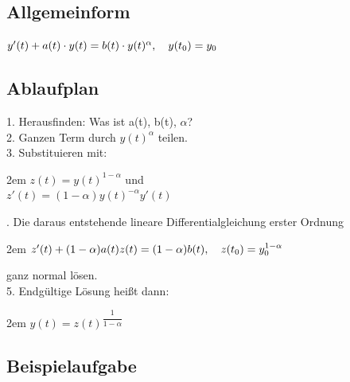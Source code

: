 \documentclass[11pt,final]{scrreprt}
\newcommand{\br} {\medskip\\}
\begin{document}
\subsection*{Allgemeinform}
$ y'(t) + a(t)\cdot y(t) = b(t)\cdot y(t)^\alpha, \hspace*{1em} y(t_0) = y_0 $
\subsection*{Ablaufplan}
1. Herausfinden: Was ist a(t), b(t), $\alpha$?\br
2. Ganzen Term durch $y(t)^\alpha$ teilen.\br
3. Substituieren mit:

\begingroup
\leftskip2em 
$ z(t) = y(t)^{1-\alpha} $ und\\
$ z'(t) = (1-\alpha)y(t)^{-\alpha}y'(t) $\\
\par	
{}. Die daraus entstehende lineare Differentialgleichung erster Ordnung

\begingroup
\leftskip2em 
$ z'(t)+(1-\alpha)a(t)z(t)=(1-\alpha)b(t), \hspace*{1em} z(t_0) = y_0^{1-\alpha} $
\par	
\endgroup 
\hspace*{1em}ganz normal lösen.\br

5. Endgültige Lösung heißt dann:

\begingroup
\leftskip2em 
$ y(t) = z(t)^{\dfrac{1}{1-\alpha}}\ $
\par	
\endgroup 

\subsection*{Beispielaufgabe}
\end{document}
